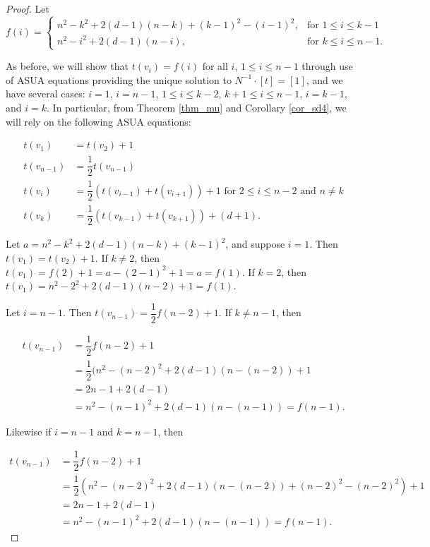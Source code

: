 \documentclass{article}
\theoremstyle{definition}
\begin{document}
\begin{proof}
    Let 
    \[
f(i) = 
\begin{cases}
    n^2- k^2 + 2(d-1)(n-k) + (k-1)^2 - (i-1)^2, & \text{for } 1 \leq i \leq k-1 \\
    n^2- i^2 + 2(d-1)(n-i), & \text{for } k \leq i \leq n-1. 
\end{cases}
\]

\noindent As before, we will show that $t(v_i) = f(i)$ for all $i$, $1 \leq i \leq n-1$ through use of ASUA equations providing the unique solution to $N^{-1}\cdot[t]=[1]$, and we have several cases: $i = 1$, $i = n-1$, $1 \leq i \leq k-2$, $k+1 \leq i \leq n-1$, $i = k-1$, and $i = k$. In particular, from Theorem \ref{thm_mu} and Corollary \ref{cor_sd4}, we will rely on the following ASUA equations:  

\begin{align*}
    t(v_1) & = t(v_2) + 1 \\
    t(v_{n-1}) & = \dfrac{1}{2}t(v_{n-1}) \\
    t(v_i) & =  \dfrac{1}{2}(t(v_{i-1}) + t(v_{i+1}))  + 1 \text{ for } 2 \leq i \leq n-2 \text{ and } n \neq k \\
    t(v_k) & = \dfrac{1}{2}(t(v_{k-1}) + t(v_{k+1})) + (d+1).
\end{align*}


\noindent Let $a = n^2 - k^2 + 2(d-1)(n-k) + (k-1)^2$, and suppose $i = 1$. Then $t(v_1) = t(v_2) + 1.$ If $k \neq 2$, then $t(v_1) = f(2) + 1 = a - (2-1)^2 + 1 = a = f(1)$. If $k = 2$, then $t(v_1) = n^2 - 2^2 + 2(d-1)(n-2) + 1 = f(1)$. 

\noindent Let $i = n-1$. Then $t(v_{n-1}) = \dfrac{1}{2}f(n-2) + 1$. If $k \neq n-1$, then 

\begin{align*}
    t(v_{n-1}) & = \dfrac{1}{2}f(n-2) + 1 \\
        & = \dfrac{1}{2}(n^2 - (n-2)^2 + 2(d-1)(n-(n-2)) + 1 \\
        & = 2n - 1 + 2(d-1) \\
        & = n^2 - (n-1)^2 + 2(d-1)(n-(n-1)) = f(n-1).
\end{align*}

\noindent Likewise if $i = n-1$ and $k = n-1$, then

\begin{align*}
    t(v_{n-1}) & = \dfrac{1}{2}f(n-2) + 1 \\
        & = \dfrac{1}{2}(n^2 - (n-2)^2 + 2(d-1)(n-(n-2)) + (n-2)^2 - (n-2)^2) + 1 \\
        & = 2n - 1 + 2(d-1) \\
        & = n^2 - (n-1)^2 + 2(d-1)(n-(n-1)) = f(n-1).
\end{align*}


\end{proof}
\end{document}
